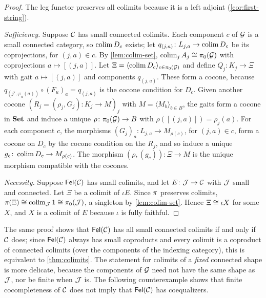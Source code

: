 \begin{proof}
The leg functor preserves all colimits because it is a left adjoint
(\cref{cor:first-string}).

\emph{Sufficiency.} Suppose $\mathcal{C}$ has small connected colimits. Each component
$c$ of $\mathcal{G}$ is a small connected category, so $\operatorname*{colim} D_c$ exists; let
$q_{(j,a)}\colon L_{j,a}\to\operatorname*{colim} D_c$ be its coprojections, for $(j,a)\in c$.
By \cref{lem:colim-set}, $\operatorname*{colim}_jA_j\cong\pi_0(\mathcal{G})$ with coprojections
$a\mapsto[(j,a)]$. Let $\Xi=\langle\operatorname*{colim} D_c\rangle_{c\in\pi_0(\mathcal{G})}$ and define
$Q_j\colon K_j\to\Xi$ with gait $a\mapsto[(j,a)]$ and components $q_{(j,a)}$.
These form a cocone, because $q_{(j',\varphi_u(a))}\circ(F_u)_a=q_{(j,a)}$ is the
cocone condition for $D_c$. Given another cocone
$(R_j=(\rho_j,G_j)\colon K_j\to M)_j$ with $M=\langle M_b\rangle_{b\in B}$, the
gaits form a cocone in $\mathbf{Set}$ and induce a unique $\rho\colon\pi_0(\mathcal{G})\to B$
with $\rho([(j,a)])=\rho_j(a)$. For each component $c$, the morphisms
$(G_j)_a\colon L_{j,a}\to M_{\rho(c)}$, for $(j,a)\in c$, form a cocone on
$D_c$ by the cocone condition on the $R_j$, and so induce a unique
$g_c\colon\operatorname*{colim} D_c\to M_{\rho(c)}$. The morphism $(\rho,(g_c))\colon\Xi\to M$
is the unique morphism compatible with the cocones.

\emph{Necessity.} Suppose $\mathsf{Fel}(\mathcal{C})$ has small colimits, and let
$E\colon\mathcal{J}\to\mathcal{C}$ with $\mathcal{J}$ small and connected. Let $\Xi$ be a colimit of
$\iota E$. Since $\pi$ preserves colimits, $\pi(\Xi)\cong\operatorname*{colim}_{\mathcal{J}}1\cong\pi_0(\mathcal{J})$,
a singleton by \cref{lem:colim-set}. Hence $\Xi\cong\iota X$ for some $X$, and
$X$ is a colimit of $E$ because $\iota$ is fully faithful.
\end{proof}

\begin{remark}\label{rem:connected-colimits}
The same proof shows that $\mathsf{Fel}(\mathcal{C})$ has all small connected colimits if and
only if $\mathcal{C}$ does; since $\mathsf{Fel}(\mathcal{C})$ always has small coproducts and every
colimit is a coproduct of connected colimits (over the components of the
indexing category), this is equivalent to \cref{thm:colimits}. The statement
for colimits of a \emph{fixed} connected shape is more delicate, because the
components of $\mathcal{G}$ need not have the same shape as $\mathcal{J}$, nor be finite when
$\mathcal{J}$ is. The following counterexample shows that finite cocompleteness of
$\mathcal{C}$ does not imply that $\mathsf{Fel}(\mathcal{C})$ has coequalizers.
\end{remark}

